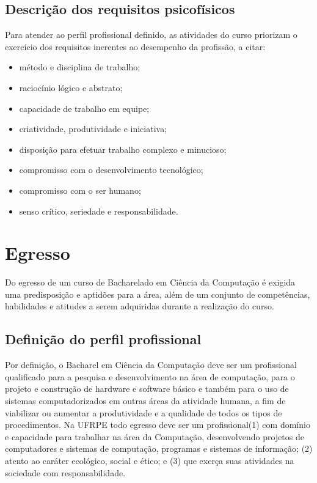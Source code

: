 \documentclass[
	12pt,				%
	openright,			%
  oneside,     %
	a4paper,			%
	english,			%
	french,				%
	spanish,			%
	brazil				%
	]{abntex2}
\begin{document}
\subsection{Descrição dos requisitos psicofísicos}
 
Para atender ao perfil profissional definido, as atividades do curso priorizam o
exercício dos requisitos inerentes ao desempenho da profissão, a citar:

\begin{itemize}
  \item método e disciplina de trabalho;
  \item raciocínio lógico e abstrato; 
  \item capacidade de trabalho em equipe; 
  \item criatividade, produtividade e iniciativa; 
  \item disposição para efetuar trabalho complexo e minucioso; 
  \item compromisso com o desenvolvimento tecnológico; 
  \item compromisso com o ser humano; 
  \item senso crítico, seriedade e responsabilidade. 
\end{itemize}


\section{Egresso}

Do egresso de um curso de Bacharelado em Ciência da Computação é exigida uma
predisposição e aptidões para a área, além de um conjunto de competências, 
habilidades e atitudes a serem adquiridas durante a realização do curso.

\subsection{Definição do perfil profissional}

Por definição, o Bacharel em Ciência da Computação deve ser um profissional 
qualificado para a pesquisa e desenvolvimento na área de computação, para  o
projeto e construção de hardware e software básico e também para o uso de 
sistemas computadorizados em outras áreas da atividade humana, a fim de
viabilizar  ou aumentar a produtividade e a qualidade de todos os tipos de
procedimentos.  Na UFRPE todo egresso deve ser um profissional(1)  com domínio e
capacidade para trabalhar na área da Computação, desenvolvendo projetos de
computadores  e sistemas de computação, programas e sistemas de informação; (2)
atento  ao caráter ecológico, social e ético; e (3) que exerça suas atividades
na  sociedade com responsabilidade.
\end{document}

